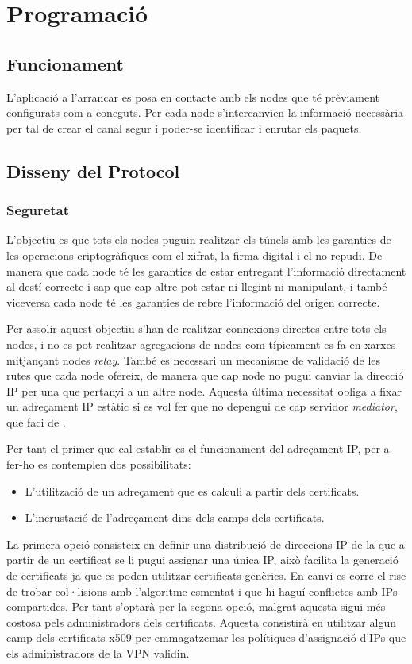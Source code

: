 \chapter{Programació}
\section{Funcionament}
L'aplicació a l'arrancar es posa en contacte amb els nodes que té prèviament configurats com a coneguts. Per cada node s'intercanvien la informació necessària per tal de crear el canal segur i poder-se identificar i enrutar els paquets.

\section{Disseny del Protocol}
\subsection{Seguretat}
L'objectiu es que tots els nodes puguin realitzar els túnels amb les garanties de les operacions criptogràfiques com el xifrat, la firma digital i el no repudi. De manera que cada node té les garanties de estar entregant l'informació directament al destí correcte i sap que cap altre pot estar ni llegint ni manipulant, i també viceversa cada node té les garanties de rebre l'informació del origen correcte.

Per assolir aquest objectiu s'han de realitzar connexions directes entre tots els nodes, i no es pot realitzar agregacions de nodes com típicament es fa en xarxes  mitjançant nodes \emph{relay}. També es necessari un mecanisme de validació de les rutes que cada node ofereix, de manera que cap node no pugui canviar la direcció IP per una que pertanyi a un altre node. Aquesta última necessitat obliga a fixar un adreçament IP estàtic si es vol fer que no depengui de cap servidor \emph{mediator}, que faci de .

Per tant el primer que cal establir es el funcionament del adreçament IP, per a fer-ho es contemplen dos possibilitats:
\begin{itemize}
\item L'utilització de un adreçament que es calculi a partir dels certificats.
\item L'incrustació de l'adreçament dins dels camps dels certificats.
\end{itemize}
La primera opció consisteix en definir una distribució de direccions IP de la que a partir de un certificat se li pugui assignar una única IP, això facilita la generació de certificats ja que es poden utilitzar certificats genèrics. En canvi es corre el risc de trobar col·lisions amb l'algoritme esmentat i que hi haguí conflictes amb IPs compartides. Per tant s'optarà per la segona opció, malgrat aquesta sigui més costosa pels administradors dels certificats. Aquesta consistirà en utilitzar algun camp dels certificats x509 per emmagatzemar les polítiques d'assignació d'IPs que els administradors de la VPN validin.

